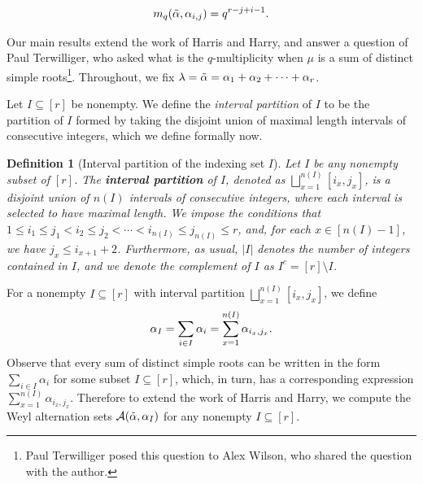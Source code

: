 \documentclass[10pt]{article}
\newtheorem{definition}[theorem]{Definition}
\newcommand{\hr}[0]{\Tilde{\alpha}}
\begin{document}
\begin{equation}
    m_q(\hr,\alpha_{i,j})=q^{r-j+i-1}.\label{kim result}
\end{equation}

Our main results extend the work of Harris and Harry, and answer a question of Paul Terwilliger, who asked what is the $q$-multiplicity when $\mu$  is a sum of distinct simple roots\footnote{Paul Terwilliger posed this question to Alex Wilson, who shared the question with the author.}. Throughout, we fix $\lambda=\hr=\alpha_1+\alpha_2+\cdots +\alpha_r$. 

Let $I\subseteq [r]$ be nonempty. 
We define the \textit{interval partition} of $I$ to be the partition of $I$ formed by taking the disjoint union of maximal length intervals of consecutive integers, which we define formally now.
\begin{definition}[Interval partition of the indexing set $I$]\label{def: interval partition}
    Let $I$ be any nonempty subset of $[r]$.  The \textbf{interval partition} of $I$, denoted as $\bigsqcup_{x=1}^{n(I)}[i_x,j_x]$, is a disjoint union of $n(I)$ intervals of consecutive integers, where each interval is selected to have maximal length.
    We impose the conditions that $1\leq i_1 \leq j_1 < i_2 \leq j_2 < \cdots < i_{n(I)} \leq j_{n(I)} \leq r$, and, for each $x\in [n(I)-1]$, we have $j_x\leq i_{x+1}+2$.     
    Furthermore, as usual, $|I|$ denotes the number of integers contained in $I$, and we denote the complement of $I$ as $I^c=[r]\setminus I$.
\end{definition}

For a nonempty $I\subseteq [r]$ with interval partition $\bigsqcup_{x=1}^{n(I)}[i_x,j_x]$, we define 
\begin{equation}\label{eq: defn of alpha_I}
    \alpha_I=\sum_{i\in I}\alpha_i=\sum_{x=1}^{n(I)}\alpha_{i_x,j_x}.\notag
\end{equation} 
Observe that every sum of distinct simple roots  can be written in the form $\sum_{i\in I}\alpha_i$ for some subset $I\subseteq [r]$, which, in turn, has a corresponding expression $\sum_{x=1}^{n(I)}\alpha_{i_x,j_x}$. Therefore to extend the work of Harris and Harry, we compute the Weyl alternation sets $\mathcal{A}(\hr,\alpha_I)$ for any nonempty $I\subseteq[r]$. 
\end{document}
